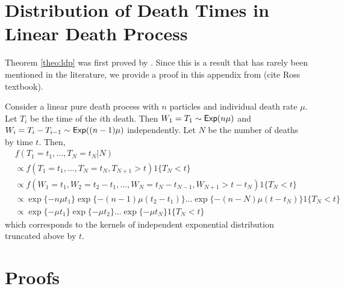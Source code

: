 \documentclass[11pt]{article}
\begin{document}
	
	\appendix
	
	\section{Distribution of Death Times in Linear Death Process}
	\label{app:ldp}
	Theorem \ref{theo:ldp} was first proved by \cite{Neuts.1971}. Since this is a result that has rarely been mentioned in the literature, we provide a proof in this appendix from (cite Ross textbook).
	
	Consider a linear pure death process with $n$ particles and individual death rate $\mu$.
	Let $T_i$ be the time of the $i$th death. Then $W_1 = T_1 \sim \textsf{Exp}(n\mu)$ and $W_i = T_i - T_{i-1} \sim \textsf{Exp}((n-1)\mu)$ independently. Let $N$ be the number of deaths by time $t$. Then, 
	\begin{align*}
		& f(T_1 = t_1, \dots, T_N = t_N | N) \\
		& \propto f(T_1 = t_1, \dots, T_N = t_N, T_{N+1} > t) 1\{T_N < t\}\\
		& \propto f(W_1 = t_1, W_2 = t_2 - t_1, \dots, W_N = t_N - t_{N-1}, W_{N+1} > t - t_N) 1\{T_N < t\}\\
		& \propto \exp\{-n\mu t_1\} \exp\{-(n-1)\mu(t_2-t_1)\}\dots \exp\{-(n-N)\mu(t - t_N)\} 1\{T_N < t\}\\
		& \propto \exp\{-\mu t_1\}\exp\{-\mu t_2\} \dots \exp\{-\mu t_N\} 1\{T_N < t\}
	\end{align*}
	which corresponds to the kernels of independent exponential distribution truncated above by $t$.
	
	
	\section{Proofs}
	\label{app:uni}
	
	
\end{document}
